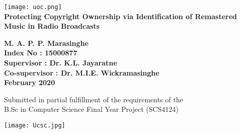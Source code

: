 \begin{titlepage}
    \begin{center}

        \texttt{[image: uoc.png]}\\
        \vspace{24pt}
        \textbf{\Huge{Protecting Copyright Ownership via Identification of Remastered Music in Radio Broadcasts}}


        \vspace{36pt}
        \textbf{{\Large{M. A. P. P. Marasinghe}}}\\
        \textbf{{\Large{Index No : 15000877}}}\\

        \vspace{36pt}
        \textbf{{\Large{Supervisor : Dr. K.L. Jayaratne}}}\\
        \textbf{{\Large{Co-supervisor : Dr. M.I.E. Wickramasinghe}}}\\

        \vspace{60pt}
        \textbf{{\Large{February 2020}}}\\
        
        \vspace{12pt}

        \large {Submitted in partial fulfillment of the requirements of the}\\
        \large {B.Sc in Computer Science Final Year Project (SCS4124)}

        \vspace{24pt}
        \texttt{[image: Ucsc.jpg]}\\

    \end{center}
\end{titlepage}